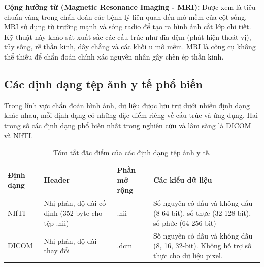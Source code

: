  \textbf{Cộng hưởng từ (Magnetic Resonance Imaging - MRI):} Được xem là tiêu chuẩn vàng trong chẩn đoán các bệnh lý liên quan đến mô mềm của cột sống. MRI sử dụng từ trường mạnh và sóng radio để tạo ra hình ảnh cắt lớp chi tiết. Kỹ thuật này khảo sát xuất sắc các cấu trúc như đĩa đệm (phát hiện thoát vị), tủy sống, rễ thần kinh, dây chằng và các khối u mô mềm. MRI là công cụ không thể thiếu để chẩn đoán chính xác nguyên nhân gây chèn ép thần kinh.

\subsection{Các định dạng tệp ảnh y tế phổ biến}
Trong lĩnh vực chẩn đoán hình ảnh, dữ liệu được lưu trữ dưới nhiều định dạng khác nhau, mỗi định dạng có những đặc điểm riêng về cấu trúc và ứng dụng. Hai trong số các định dạng phổ biến nhất trong nghiên cứu và lâm sàng là DICOM và NIfTI.

\begin{table}[h!]
\centering
\caption{Tóm tắt đặc điểm của các định dạng tệp ảnh y tế.}
\label{tab:file_formats}
\begin{tabular}{|l|p{4cm}|l|p{5cm}|}
\hline
\textbf{Định dạng} & \textbf{Header} & \textbf{Phần mở rộng} & \textbf{Các kiểu dữ liệu} \\ \hline
NIfTI & Nhị phân, độ dài cố định (352 byte cho tệp .nii) & .nii & Số nguyên có dấu và không dấu (8-64 bit), số thực (32-128 bit), số phức (64-256 bit) \\ \hline
DICOM & Nhị phân, độ dài thay đổi & .dcm & Số nguyên có dấu và không dấu (8, 16, 32-bit). Không hỗ trợ số thực cho dữ liệu pixel. \\ \hline
\end{tabular}
\end{table}

